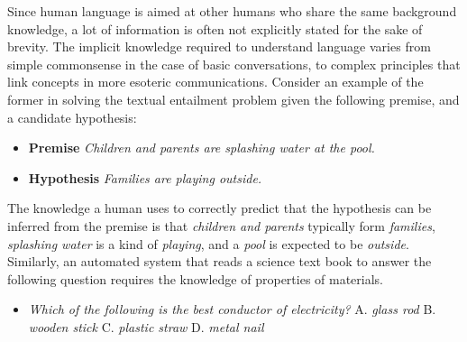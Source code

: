Since human language is aimed at other humans who share 
the same background knowledge, a lot of information is often not explicitly stated
for the sake of brevity. The implicit knowledge required to understand language varies 
from simple commonsense in the case of basic conversations, to complex principles that link 
concepts in more esoteric communications. Consider an example of the former in solving the 
textual entailment problem given the following premise, and a candidate hypothesis:
\begin{itemize}
 \item \textbf{Premise} \textit{Children and parents are splashing water at the pool.}
 \item \textbf{Hypothesis} \textit{Families are playing outside.}
\end{itemize}
The knowledge a human uses to correctly predict that the hypothesis can be inferred from the 
premise is that \textit{children and parents} typically form \textit{families}, \textit{splashing water} 
is a kind of \textit{playing}, and a \textit{pool} is expected to be \textit{outside}. Similarly, an 
automated system that reads a science text book to answer the following 
question requires the knowledge of properties of materials.
\begin{itemize}
 \item \textit{Which of the following is the best conductor of electricity?} 
 A. \textit{glass rod} B. \textit{wooden stick} C. \textit{plastic straw} D. \textit{metal nail}
\end{itemize}

